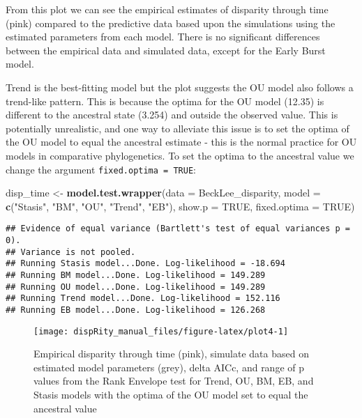 \documentclass[
]{book}
\newenvironment{Shaded}{\begin{snugshade}}{\end{snugshade}}
\newcommand{\DataTypeTok}[1]{\textcolor[rgb]{0.13,0.29,0.53}{#1}}
\newcommand{\KeywordTok}[1]{\textcolor[rgb]{0.13,0.29,0.53}{\textbf{#1}}}
\newcommand{\NormalTok}[1]{#1}
\newcommand{\OtherTok}[1]{\textcolor[rgb]{0.56,0.35,0.01}{#1}}
\newcommand{\StringTok}[1]{\textcolor[rgb]{0.31,0.60,0.02}{#1}}
\begin{document}
From this plot we can see the empirical estimates of disparity through time (pink) compared to the predictive data based upon the simulations using the estimated parameters from each model.
There is no significant differences between the empirical data and simulated data, except for the Early Burst model.

Trend is the best-fitting model but the plot suggests the OU model also follows a trend-like pattern.
This is because the optima for the OU model (12.35) is different to the ancestral state (3.254) and outside the observed value.
This is potentially unrealistic, and one way to alleviate this issue is to set the optima of the OU model to equal the ancestral estimate - this is the normal practice for OU models in comparative phylogenetics.
To set the optima to the ancestral value we change the argument \texttt{fixed.optima\ =\ TRUE}:

\begin{Shaded}
\begin{Highlighting}[]
\NormalTok{disp\_time \textless{}{-}}\StringTok{ }\KeywordTok{model.test.wrapper}\NormalTok{(}\DataTypeTok{data =}\NormalTok{ BeckLee\_disparity,}
                    \DataTypeTok{model =} \KeywordTok{c}\NormalTok{(}\StringTok{"Stasis"}\NormalTok{, }\StringTok{"BM"}\NormalTok{, }\StringTok{"OU"}\NormalTok{, }\StringTok{"Trend"}\NormalTok{, }\StringTok{"EB"}\NormalTok{),}
                                \DataTypeTok{show.p =} \OtherTok{TRUE}\NormalTok{, }\DataTypeTok{fixed.optima =} \OtherTok{TRUE}\NormalTok{)}
\end{Highlighting}
\end{Shaded}

\begin{verbatim}
## Evidence of equal variance (Bartlett's test of equal variances p = 0).
## Variance is not pooled.
## Running Stasis model...Done. Log-likelihood = -18.694
## Running BM model...Done. Log-likelihood = 149.289
## Running OU model...Done. Log-likelihood = 149.289
## Running Trend model...Done. Log-likelihood = 152.116
## Running EB model...Done. Log-likelihood = 126.268
\end{verbatim}

\begin{figure}

{\centering \texttt{[image: dispRity\_manual\_files/figure-latex/plot4-1]} 

}

\caption{Empirical disparity through time (pink), simulate data based on estimated model parameters (grey), delta AICc, and range of p values from the Rank Envelope test for Trend, OU, BM, EB, and Stasis models with the optima of the OU model set to equal the ancestral value}\label{fig:plot4}
\end{figure}
\end{document}
